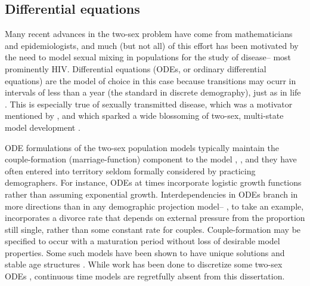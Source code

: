 \subsection{Differential equations} 
Many recent advances in the two-sex problem
have come from mathematicians and epidemiologists, and much (but not all) of
this effort has been motivated by the need to model sexual mixing in
populations for the study of disease-- most prominently HIV. Differential
equations (ODEs, or ordinary differential equations) are the model of choice in
this case because transitions may ocurr in intervals of less than a year 
(the standard in discrete demography), just as in
life \citep{hoppensteadt1975mathematical}. This is especially true of sexually
transmitted disease, which was a motivator mentioned by \citet{hadeler1988models}, and which sparked a wide blossoming
of two-sex, multi-state model development
\citep{dietz1988epidemiological,hadeler1989pair,busenberg1991general,blythe1991toward}.

ODE formulations of the two-sex population models typically maintain the
couple-formation (marriage-function) component to the model
\citep{Fredrickson1971,inaba1992age}, 
\citep[see e.g.][for a good overview]{ianelli2005gender}, and they have often entered into
territory seldom formally considered by practicing demographers. For instance,
ODEs at times incorporate logistic growth
functions\citep{castillo1995logistic,yang2009logisticwb,yang2009logistic} rather
than assuming exponential growth\citep{martcheva1999exponential}. Interdependencies in ODEs branch in more directions than in any demographic
projection model-- \citet{maxin2010two}, to take an example, incorporates a
divorce rate that depends on external pressure from the proportion still single,
rather than some constant rate for couples. Couple-formation may be
specified to occur with a maturation period without
loss of desirable model properties\citep{hadeler1993pair}. Some such models have
been shown to have unique solutions \citep{martcheva1999two} and stable age
structures \citep{inaba2000persistent}. While work has been done to
discretize some two-sex ODEs \citep{arbogast1989finite,
martcheva2001mathematics, ianelli2005gender}, continuous time models are
regretfully absent from this dissertation.

